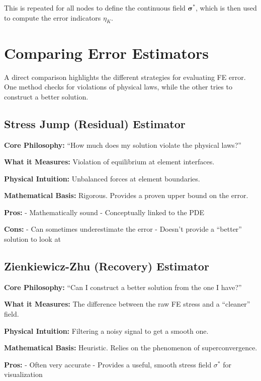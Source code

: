 \documentclass[
  11pt,
  a4paper,
]{scrbook}
\begin{document}
This is repeated for all nodes to define the continuous field
\(\boldsymbol{\sigma}^*\), which is then used to compute the error
indicators \(\eta_K\).

\section{Comparing Error Estimators}\label{comparing-error-estimators}

A direct comparison highlights the different strategies for evaluating
FE error. One method checks for violations of physical laws, while the
other tries to construct a better solution.

\subsection{Stress Jump (Residual)
Estimator}\label{stress-jump-residual-estimator}

\textbf{Core Philosophy:} ``How much does my solution violate the
physical laws?''

\textbf{What it Measures:} Violation of equilibrium at element
interfaces.

\textbf{Physical Intuition:} Unbalanced forces at element boundaries.

\textbf{Mathematical Basis:} Rigorous. Provides a proven upper bound on
the error.

\textbf{Pros:} - Mathematically sound - Conceptually linked to the PDE

\textbf{Cons:} - Can sometimes underestimate the error - Doesn't provide
a ``better'' solution to look at

\subsection{Zienkiewicz-Zhu (Recovery)
Estimator}\label{zienkiewicz-zhu-recovery-estimator}

\textbf{Core Philosophy:} ``Can I construct a better solution from the
one I have?''

\textbf{What it Measures:} The difference between the raw FE stress and
a ``cleaner'' field.

\textbf{Physical Intuition:} Filtering a noisy signal to get a smooth
one.

\textbf{Mathematical Basis:} Heuristic. Relies on the phenomenon of
superconvergence.

\textbf{Pros:} - Often very accurate - Provides a useful, smooth stress
field \(\sigma^*\) for visualization
\end{document}
